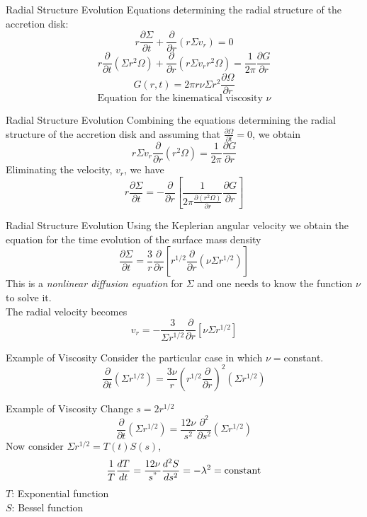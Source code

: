 \documentclass{beamer}
\begin{document}
\begin{frame}{Radial Structure Evolution}
	Equations determining the radial structure of the accretion disk:
	\[ r \frac{\partial \Sigma}{\partial t} + \frac{\partial}{\partial r} \left( r \Sigma v_r \right) = 0\] 
	\[ r \frac{\partial }{\partial t} \left( \Sigma r^2 \Omega \right) + \frac{\partial}{\partial r} \left( r \Sigma v_r  r^2 \Omega\right) = \frac{1}{2\pi} \frac{\partial G}{\partial r}\] 
	\[G(r,t) = 2\pi r \nu \Sigma r^2  \frac{\partial \Omega}{\partial r}\]
	\[\textrm{Equation for the kinematical viscosity } \nu\]
\end{frame}

\begin{frame}{Radial Structure Evolution}
	Combining the equations determining the radial structure of the accretion disk and assuming that $\frac{\partial \Omega}{\partial t} = 0 $, we obtain
	\[ r \Sigma v_r \frac{\partial}{\partial r} \left( r^2 \Omega\right) = \frac{1}{2\pi} \frac{\partial G}{\partial r}\] 
	\pause
	Eliminating the velocity, $v_r$, we have
	\[ r \frac{\partial \Sigma}{\partial t} = -\frac{\partial }{\partial r} \left[ \frac{1}{2\pi \frac{\partial \left( r^2 \Omega\right)}{\partial r}  } \frac{\partial G}{\partial r} \right]\] 
\end{frame}

\begin{frame}{Radial Structure Evolution}
	Using the Keplerian angular velocity we obtain the equation for the time evolution of the surface mass density
	\pause
	\[ \frac{\partial \Sigma}{\partial t} = \frac{3}{r} \frac{\partial }{\partial r} \left[ r^{1/2} \frac{\partial }{\partial r} \left( \nu \Sigma r^{1/2}\right) \right]\] 
	\pause
	This is a \textit{nonlinear diffusion equation} for $\Sigma$ and one needs to know the function $\nu$ to solve it.\\
	\pause
	The radial velocity becomes 
	\[v_r = - \frac{3 }{\Sigma r^{1/2}} \frac{\partial }{\partial r} \left[ \nu \Sigma r^{1/2}\right]\]
\end{frame}

\begin{frame}{Example of Viscosity}
	Consider the particular case in which $\nu=$constant.
	\pause
	\[ \frac{\partial }{\partial t} \left( \Sigma r^{1/2} \right) = \frac{3\nu }{r} \left( r^{1/2}  \frac{\partial }{\partial r} \right)^2 \left( \Sigma r^{1/2}\right) \] 
\end{frame}

\begin{frame}{Example of Viscosity}
	Change $s = 2r^{1/2}$
	\pause
	\[ \frac{\partial }{\partial t} \left( \Sigma r^{1/2} \right) = \frac{12\nu }{s^2} \frac{\partial ^2 }{\partial s^2}  \left( \Sigma r^{1/2}\right) \] 
	\pause
	Now consider $\Sigma r^{1/2} = T(t) S(s)$,
	\pause
	\[ \frac{1}{T} \frac{dT}{dt}= \frac{12\nu}{s^"} \frac{d^2 S}{ds^2}= -\lambda^2 = \textrm{constant} \]
	\pause
	$T$: Exponential function\\
	$S$: Bessel function
\end{frame}
\end{document}
